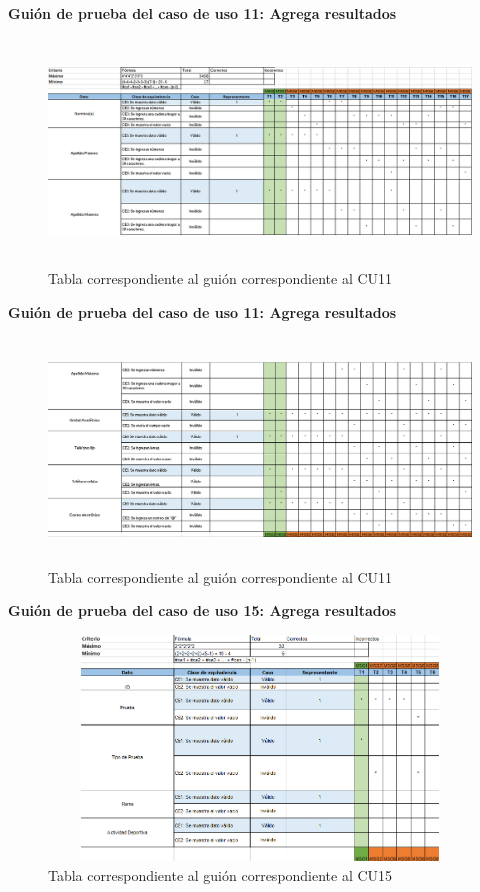 	\textbf{Guión de prueba del caso de uso 11: Agrega resultados}

	\begin{figure}[hbt!]
		\centering
		\includegraphics[width=14cm, height=6cm]{Imagenes/Pruebas/GuionPruebaCU11}
		\caption{Tabla correspondiente al guión correspondiente al CU11}
		\label{guionpruebaCU11}
	\end{figure}
\pagebreak

	\textbf{Guión de prueba del caso de uso 11: Agrega resultados}
	\begin{figure}[hbt!]
		\centering
		\includegraphics[width=14cm, height=6cm]{Imagenes/Pruebas/GuionPruebaCU11_1}
		\caption{Tabla correspondiente al guión correspondiente al CU11}
		\label{guionpruebaCU11_1}
	\end{figure}

	\textbf{Guión de prueba del caso de uso 15: Agrega resultados}
	\begin{figure}[hbt!]
		\centering
		\includegraphics[width=14cm, height=6cm]{Imagenes/Pruebas/GuionPruebaCU15}
		\caption{Tabla correspondiente al guión correspondiente al CU15}
		\label{guionpruebaCU15}
	\end{figure}
\pagebreak
	
